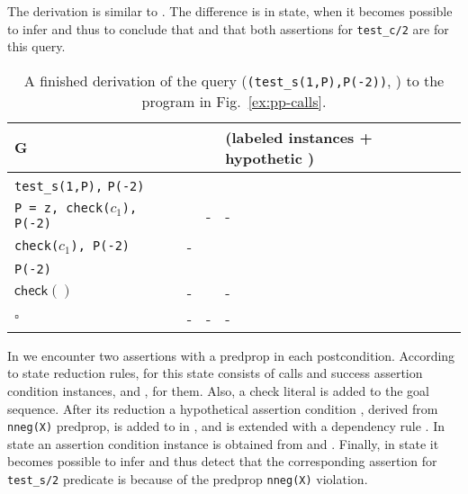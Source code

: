 \documentclass{llncs}
\newcommand{\kbd}[1]{\mbox{\tt #1}}
\newcommand{\emptyGoal}{\ensuremath{\square}}
\newcommand{\asrId}[1]{\ensuremath{c_{#1}}}
\newcommand{\checkLitLab}[1]{\ensuremath{\textsf{check}(#1)}}
\begin{document}
The derivation  is similar to . The difference is in
 state, when it becomes possible to infer  and thus to conclude that  and that both assertions
for \kbd{test\_c/2} are  for this query.

\begin{table}[h]
  \caption{A finished derivation of the query 
    (\kbd{(test\_s(1,P),P(-2))}, ) to the program in 
    Fig.~\ref{ex:pp-calls}.}
  \begin{minipage}{\textwidth}
    \small
    \begin{tabular}{p{}|p{}p{}p{}}
      \hline
      G         
         &   
         &  
          & (labeled instances + hypothetic )
      \\ \hline
      {\tt test\_s(1,P),}\newline
      \kbd{P(-2)}
          &         
          &  \newline
            
          & 
            \newline
                 
      \\ \hline
      {\tt P = z, check(\asrId{1}),}\newline
      \texttt{P(-2)}
          & 
          & -
          & -
      \\ \hline
      {\tt check(\asrId{1}), P(-2)}
          & -
          & 
          & 
      \\ \hline
      \texttt{P(-2)}
          & 
          & 
          & 
      \\ \hline
      \checkLitLab{}
        & -
        &  
        & -
      \\ \hline
      \emptyGoal
          & -        
          & -
          & -
      \\ \hline
    \end{tabular}
  \end{minipage}
  \label{tbl:test5}
\end{table}

In  we encounter two assertions with a predprop in
each postcondition.
According to state reduction rules,  for this state
consists of calls and success assertion condition instances,
 and , 
for them.
Also, a check literal  is added to the goal
sequence.
After its reduction a hypothetical assertion condition ,
derived from \kbd{nneg(X)} predprop, is added to  in
, and  is extended with a dependency rule
.
In state  an assertion condition instance
 is obtained from  and .
Finally, in state  it becomes possible to infer
 and thus detect that the corresponding
assertion for \kbd{test\_s/2} predicate is  because of the
predprop \kbd{nneg(X)} violation.
\end{document}
